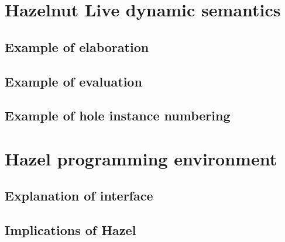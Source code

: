 \section{Hazelnut Live dynamic semantics}
\label{sec:dynamics}

\subsection{Example of elaboration}
\label{sec:elaboration_example}

\subsection{Example of evaluation}
\label{sec:evaluation_example}

\subsection{Example of hole instance numbering}
\label{sec:hole_instance_example}

\section{Hazel programming environment}
\label{sec:hazel_online}

\subsection{Explanation of interface}
\label{sec:hazel_interface}

\subsection{Implications of Hazel}
\label{sec:hazel_implications}

